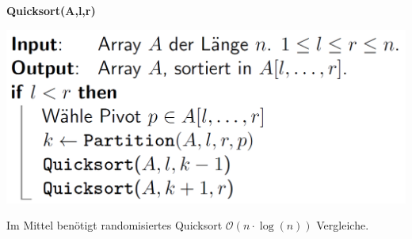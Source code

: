 \begin{sectionbox}
\textbf{Quicksort(A,l,r)}\par
\includegraphics[width = 0.8\columnwidth]{../img/QuicksortCode.png}
\par\smallskip
\begin{greenbox}
Im Mittel benötigt randomisiertes Quicksort $\mathcal{O}(n \cdot \operatorname{log}(n))$ Vergleiche.
\end{greenbox}
\end{sectionbox}

\vspace{36px}